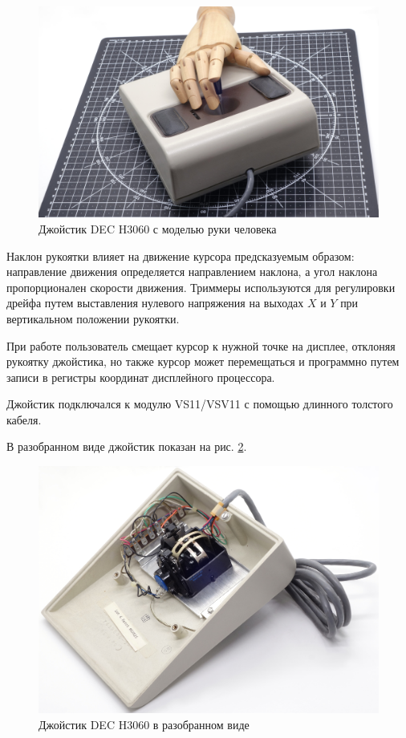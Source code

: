 \documentclass[11pt, a4paper]{article}
\begin{document}
\begin{figure}[h]
    \centering
    \includegraphics[scale=0.35]{1978_dec_h3060_joystick/hand_30.jpg}
    \caption{Джойстик DEC H3060 с моделью руки человека}
    \label{fig:DecJoystickHand}
\end{figure}

Наклон рукоятки влияет на движение курсора предсказуемым образом: направление движения определяется направлением наклона, а угол наклона пропорционален скорости движения. Триммеры используются для регулировки дрейфа путем выставления нулевого напряжения на выходах $X$ и $Y$ при вертикальном положении рукоятки.

При работе пользователь смещает курсор к нужной точке на дисплее, отклоняя рукоятку джойстика, но также курсор может перемещаться и программно путем записи в регистры координат дисплейного процессора.

Джойстик подключался к модулю VS11/VSV11 с помощью длинного толстого кабеля.


В разобранном виде джойстик показан на рис. \ref{fig:DecJoystickInside}. 

\begin{figure}[h]
    \centering
    \includegraphics[scale=0.5]{1978_dec_h3060_joystick/inside_30.jpg}
    \caption{Джойстик DEC H3060 в разобранном виде}
    \label{fig:DecJoystickInside}
\end{figure}
\end{document}
